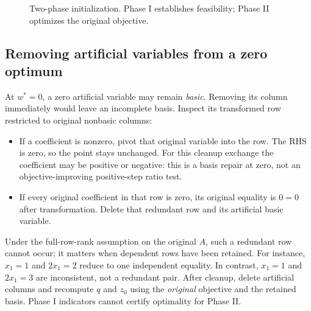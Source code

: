 \documentclass[11pt,a4paper]{article}
\begin{document}
\begin{figure}[H]
  \centering
  \caption{Two-phase initialization. Phase I establishes feasibility;
    Phase II optimizes the original objective.}
  \label{fig:phase-flow}
\end{figure}

\subsection{Removing artificial variables from a zero optimum}
At $w^*=0$, a zero artificial variable may remain \emph{basic}. Removing its
column immediately would leave an incomplete basis. Inspect its transformed
row restricted to original nonbasic columns:
\begin{itemize}[leftmargin=*]
  \item If a coefficient is nonzero, pivot that original variable into the row.
        The RHS is zero, so the point stays unchanged. For this cleanup exchange
        the coefficient may be positive or negative: this is a basis repair at
        zero, not an objective-improving positive-step ratio test.
  \item If every original coefficient in that row is zero, its original
        equality is $0=0$ after transformation. Delete that redundant row and its
        artificial basic variable.
\end{itemize}
Under the full-row-rank assumption on the original $A$, such a redundant row
cannot occur; it matters when dependent rows have been retained. For instance,
$x_1=1$ and $2x_1=2$ reduce to one independent equality. In contrast,
$x_1=1$ and $2x_1=3$ are inconsistent, not a redundant pair.
After cleanup, delete artificial columns and recompute $q$ and $z_0$ using the
\emph{original} objective and the retained basis. Phase I indicators cannot
certify optimality for Phase II.
\end{document}
